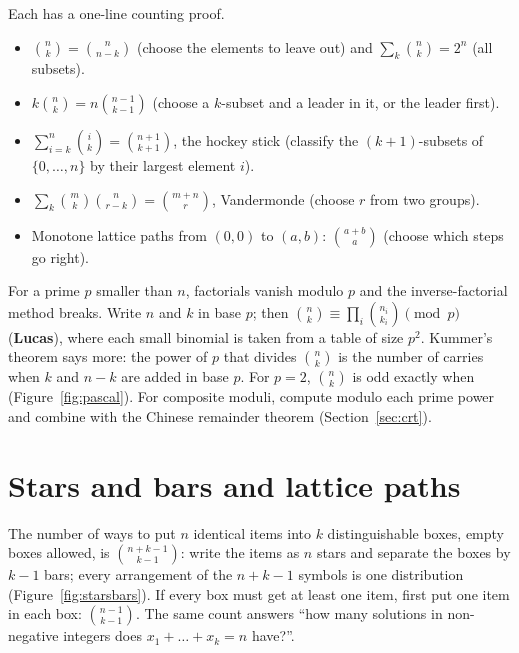 \begin{fact}
Each has a one-line counting proof.
\begin{itemize}
  \item $\binom{n}{k} = \binom{n}{n-k}$ (choose the elements to leave out) and $\sum_k \binom{n}{k} = 2^n$ (all subsets).
  \item $k \binom{n}{k} = n \binom{n-1}{k-1}$ (choose a $k$-subset and a leader in it, or the leader first).
  \item $\sum_{i=k}^{n} \binom{i}{k} = \binom{n+1}{k+1}$, the hockey stick (classify the $(k+1)$-subsets of $\{0, \dots, n\}$ by their
        largest element $i$).
  \item $\sum_k \binom{m}{k}\binom{n}{r-k} = \binom{m+n}{r}$, Vandermonde (choose $r$ from two groups).
  \item Monotone lattice paths from $(0, 0)$ to $(a, b)$: $\binom{a+b}{a}$ (choose which steps go right).
\end{itemize}
\end{fact}

\begin{trick}
For a prime $p$ smaller than $n$, factorials vanish modulo $p$ and the inverse-factorial method breaks. Write $n$ and $k$ in base $p$;
then $\binom{n}{k} \equiv \prod_i \binom{n_i}{k_i} \pmod p$ (\textbf{Lucas}), where each small binomial is taken from a table of size
$p^2$. Kummer's theorem says more: the power of $p$ that divides $\binom{n}{k}$ is the number of carries when $k$ and $n - k$ are
added in base $p$. For $p = 2$, $\binom{n}{k}$ is odd exactly when  (Figure~\ref{fig:pascal}). For composite moduli,
compute modulo each prime power and combine with the Chinese remainder theorem (Section~\ref{sec:crt}).
\end{trick}

\section[Stars and bars and lattice paths]{Stars and bars and lattice paths \hfill \gold}\label{sec:starsbars}

The number of ways to put $n$ identical items into $k$ distinguishable boxes, empty boxes allowed, is $\binom{n + k - 1}{k - 1}$: write
the items as $n$ stars and separate the boxes by $k - 1$ bars; every arrangement of the $n + k - 1$ symbols is one distribution
(Figure~\ref{fig:starsbars}). If every box must get at least one item, first put one item in each box: $\binom{n - 1}{k - 1}$. The same
count answers ``how many solutions in non-negative integers does $x_1 + \dots + x_k = n$ have?''.

